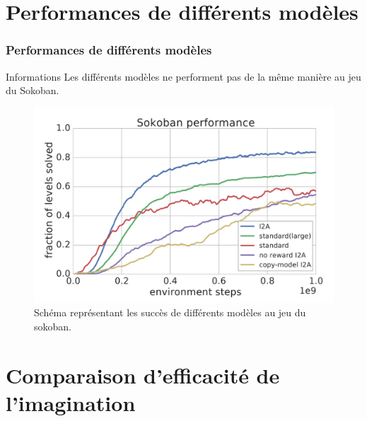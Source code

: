 \documentclass[
	11pt, %
]{beamer}
\begin{document}
\section{Performances de différents modèles}

\begin{frame}
	\frametitle{Performances de différents modèles}
	
	\smallskip %

	\begin{block}{Informations}
		Les différents modèles ne performent pas de la même manière au jeu du Sokoban.
	\end{block}

	\begin{figure}
		\centering
		\includegraphics[width=0.65\linewidth]{Images/sokoban_performance.png}
		\caption{Schéma représentant les succès de différents modèles au jeu du sokoban.}
	\end{figure}
	
	\smallskip %

\end{frame}

\section{Comparaison d'efficacité de l'imagination}
\end{document}
